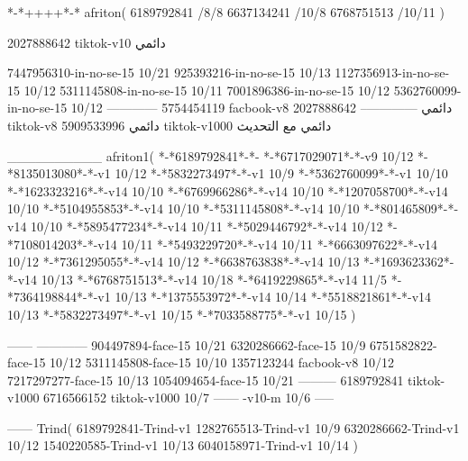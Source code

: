 *-*++++*-*
afriton(
6189792841 /8/8
6637134241 /10/8
6768751513 /10/11
)

2027888642 tiktok-v10
دائمي


7447956310-in-no-se-15 10/21
925393216-in-no-se-15 10/13
1127356913-in-no-se-15 10/12
5311145808-in-no-se-15 10/11
7001896386-in-no-se-15 10/12
5362760099-in-no-se-15 10/12
------------
5754454119 facbook-v8
دائمي
--------------
2027888642 tiktok-v8
دائمي
5909533996 tiktok-v1000
دائمي مع التحديث

__________
afriton1(
*-*6189792841*-*-
*-*6717029071*-*-v9 10/12
*-*8135013080‌*-*-v1 10/12
*-*5832273497*-*-v1 10/9
*-*5362760099*-*-v1 10/10
*-*1623323216*-*-v14 10/10
*-*6769966286*-*-v14 10/10
*-*1207058700*-*-v14 10/10
*-*5104955853*-*-v14 10/10
*-*5311145808*-*-v14 10/10
*-*801465809*-*-v14 10/10
*-*5895477234*-*-v14 10/11
*-*5029446792*-*-v14 10/12
*-*7108014203*-*-v14 10/11
*-*5493229720*-*-v14 10/11
*-*6663097622*-*-v14 10/12
*-*7361295055*-*-v14 10/12
*-*6638763838*-*-v14 10/13
*-*1693623362*-*-v14 10/13
*-*6768751513*-*-v14 10/18
*-*6419229865*-*-v14 11/5
*-*7364198844*-*-v1 10/13
*-*1375553972*-*-v14 10/14
*-*5518821861*-*-v14 10/13
*-*5832273497*-*-v1 10/15
*-*7033588775*-*-v1 10/15
)

------
------------
904497894-face-15 10/21
6320286662-face-15 10/9
6751582822-face-15 10/12
5311145808-face-15 10/10
1357123244 facbook-v8 10/12
7217297277-face-15 10/13
1054094654-face-15 10/21
---------
6189792841 tiktok-v1000
6716566152 tiktok-v1000
10/7
------
-v10-m 10/6
-----

------
Trind(
6189792841-Trind-v1 
1282765513-Trind-v1 10/9
6320286662-Trind-v1 10/12
1540220585-Trind-v1 10/13
6040158971-Trind-v1 10/14
)
